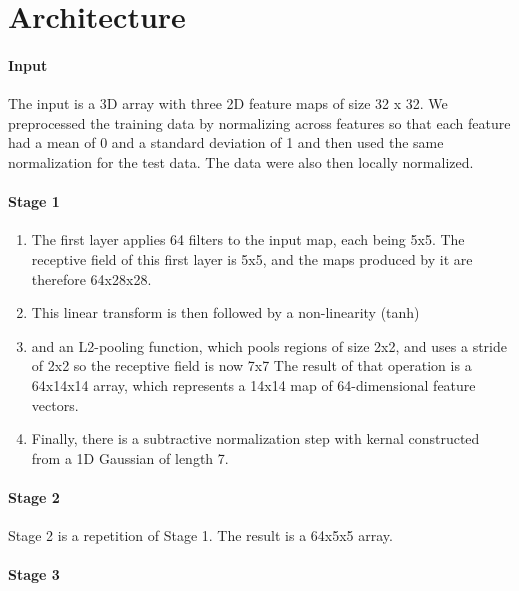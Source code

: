 \documentclass[10pt,letterpaper]{article}
\begin{document}
\section{Architecture}
\label{architecture}

\paragraph{Input}\label{input}

The input is a 3D array with three 2D feature maps of size 32 x 32. We preprocessed the training data 
by normalizing across features so that each feature had a mean of 0 and a standard deviation of 1 and then
used the same normalization for the test data. The data were also then locally normalized.

\paragraph{Stage 1}\label{stage-1}

\begin{enumerate}
\def\labelenumi{\arabic{enumi}.}
\item
  The first layer applies 64 filters to the input map, each being 5x5.
  The receptive field of this first layer is 5x5, and the maps produced
  by it are therefore 64x28x28.
\item
  This linear transform is then followed by a non-linearity (tanh)
\item
  and an L2-pooling function, which pools regions of size 2x2, and uses
  a stride of 2x2 so the receptive field is now 7x7 The result of that
  operation is a 64x14x14 array, which represents a 14x14 map of
  64-dimensional feature vectors.
\item
  Finally, there is a subtractive normalization step with kernal
  constructed from a 1D Gaussian of length 7.
\end{enumerate}

\paragraph{Stage 2}\label{stage-2}


Stage 2 is a repetition of Stage 1. The result is a 64x5x5 array.

\paragraph{Stage 3}\label{stage-3}
\end{document}
